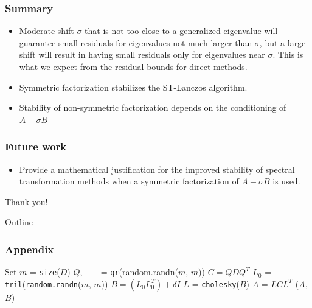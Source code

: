\documentclass[landscape]{beamer}
\begin{document}
\begin{frame}
	\frametitle{Summary}
	\begin{itemize}
		\item Moderate shift $\sigma$ that is not too close to a generalized eigenvalue will guarantee small residuals for eigenvalues not much larger than $\sigma$, but a large shift will result in having
		small residuals only for eigenvalues near $\sigma$. This is what we expect from the residual bounds for direct methods.
		\item Symmetric factorization stabilizes the ST-Lanczos algorithm.
		\item Stability of non-symmetric factorization depends on the conditioning of $A-\sigma B$
	\end{itemize}
\end{frame}

\begin{frame}
	\frametitle{Future work}
	\begin{itemize}
		\item Provide a mathematical justification for the improved stability of spectral transformation methods when a symmetric factorization of $A-\sigma B$ is used.
	\end{itemize}
\end{frame}

\begin{frame}
	\begin{center}
		\Huge{Thank you!}
	\end{center}
\end{frame}

\begin{frame}[allowframebreaks]{Outline}
	\frametitle{Appendix}
		\begin{algorithmic}[1]
		\State Set $m$ = \texttt{size}($D$)
		\State $Q$, \_\_ = \texttt{qr}(random.randn($m$, $m$))
		\State $C = QDQ^T$
		\State $L_{0}$ = \texttt{tril}(\texttt{random.randn}($m$, $m$))
		\State $B = (L_0 L_0^T) + \delta I$
		\State $L$ = \texttt{cholesky}($B$)
		\State $A$ = $LCL^T$
		\State \Return ($A$, $B$)
		\EndFunction
	\end{algorithmic}
\end{frame}
\end{document}
